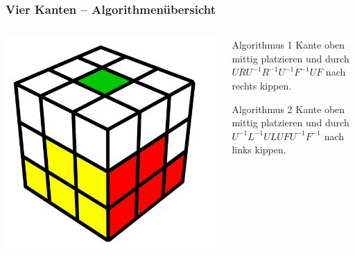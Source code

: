 \begin{frame}
	\frametitle{Vier Kanten -- Algorithmenübersicht}
	
	\begin{columns}[c]
		\begin{column}[C]{.5\textwidth}
			\center
			\includegraphics[scale=0.3]{img/layer2edge3}
		\end{column}
		\begin{column}[C]{.5\textwidth}
			\begin{exampleblock}{Algorithmus 1}
				Kante oben mittig platzieren und durch $URU^{-1}R^{-1}U^{-1}F^{-1}UF$ nach rechts kippen.
			\end{exampleblock}
			\begin{exampleblock}{Algorithmus 2}
				Kante oben mittig platzieren und durch $U^{-1}L^{-1}ULUFU^{-1}F^{-1}$ nach links kippen.
			\end{exampleblock}
		\end{column}
	\end{columns}
	
\end{frame}

